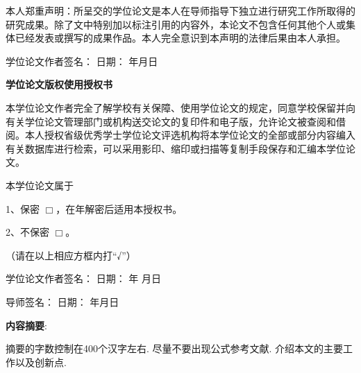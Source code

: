 \documentclass[a4paper,12pt,hyperref,twoside]{ctexart}
\newcommand{\MakeBox}[3][s]
    {\makebox[#2\ccwd][#1]{\let \CJKglue \hfill #3}}
\numberwithin{equation}{section}
\begin{document}
\begin{spacing}{1.65}

本人郑重声明：所呈交的学位论文是本人在导师指导下独立进行研究工作所取得的研究成果。除了文中特别加以标注引用的内容外，本论文不包含任何其他个人或集体已经发表或撰写的成果作品。本人完全意识到本声明的法律后果由本人承担。

{  学位论文作者签名：}\hspace*{3cm}  日期：\hspace*{1.2cm} 年\hspace*{.6cm}月\hspace*{.6cm}日\hfill

\vspace*{50pt}
\centerline{\bfseries \kaishu 学位论文版权使用授权书}
\medskip

本学位论文作者完全了解学校有关保障、使用学位论文的规定，同意学校保留并向有关学位论文管理部门或机构送交论文的复印件和电子版，允许论文被查阅和借阅。本人授权省级优秀学士学位论文评选机构将本学位论文的全部或部分内容编入有关数据库进行检索，可以采用影印、缩印或扫描等复制手段保存和汇编本学位论文。\vspace*{1.9cm}
\end{spacing}

\begin{spacing}{1.6}
本学位论文属于

1、保密 \quad $\Box$，在\underline{\MakeBox{3}{}}年解密后适用本授权书。

2、不保密 \quad $\Box$。

（请在以上相应方框内打“√”）

{ \fangsong 学位论文作者签名：} \hspace*{3cm}  日期：\hspace *{1.2cm} 年 \hspace*{.6cm}月\hspace*{.6cm}日\hfill

{ \fangsong 导师签名：} \hspace*{4.7cm}  日期：\hspace*{1.2cm} 年\hspace*{.6cm}月\hspace*{.6cm}日\hfill
\end{spacing}
\restoregeometry

\newpage %
\pagestyle{empty}%
\tableofcontents      %
\newpage %
\pagestyle{fancy}%
\setcounter{page}{1}%
\textbf{内容摘要}: %
  摘要的字数控制在400个汉字左右. 尽量不要出现公式参考文献. 介绍本文的主要工作以及创新点.
\end{document}
